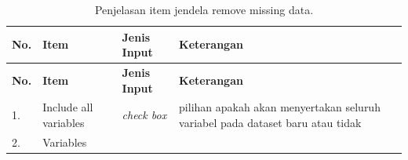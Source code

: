 \documentclass[12pt,]{krantz}
\begin{document}
\begin{longtable}[]{@{}llll@{}}
\caption{\label{tab:missing} Penjelasan item jendela remove missing data.}\tabularnewline
\toprule
\begin{minipage}[b]{0.04\columnwidth}\raggedright
\textbf{No.}\strut
\end{minipage} & \begin{minipage}[b]{0.14\columnwidth}\raggedright
\textbf{Item}\strut
\end{minipage} & \begin{minipage}[b]{0.09\columnwidth}\raggedright
\textbf{Jenis Input}\strut
\end{minipage} & \begin{minipage}[b]{0.61\columnwidth}\raggedright
\textbf{Keterangan}\strut
\end{minipage}\tabularnewline
\midrule
\endfirsthead
\toprule
\begin{minipage}[b]{0.04\columnwidth}\raggedright
\textbf{No.}\strut
\end{minipage} & \begin{minipage}[b]{0.14\columnwidth}\raggedright
\textbf{Item}\strut
\end{minipage} & \begin{minipage}[b]{0.09\columnwidth}\raggedright
\textbf{Jenis Input}\strut
\end{minipage} & \begin{minipage}[b]{0.61\columnwidth}\raggedright
\textbf{Keterangan}\strut
\end{minipage}\tabularnewline
\midrule
\endhead
\begin{minipage}[t]{0.04\columnwidth}\raggedright
1.\strut
\end{minipage} & \begin{minipage}[t]{0.14\columnwidth}\raggedright
Include all variables\strut
\end{minipage} & \begin{minipage}[t]{0.09\columnwidth}\raggedright
\emph{check box}\strut
\end{minipage} & \begin{minipage}[t]{0.61\columnwidth}\raggedright
pilihan apakah akan menyertakan seluruh variabel pada dataset baru atau tidak\strut
\end{minipage}\tabularnewline
\begin{minipage}[t]{0.04\columnwidth}\raggedright
2.\strut
\end{minipage} & \begin{minipage}[t]{0.14\columnwidth}\raggedright
Variables\strut

\end{minipage}
\end{longtable}
\end{document}
